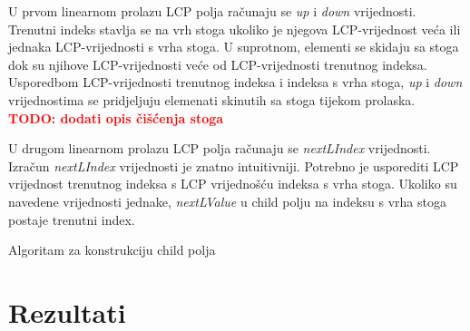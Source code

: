\documentclass[times, utf8, seminar, numeric]{fer}
\newcommand\todo[1]{\textbf{\textcolor{red}{TODO: #1}}}
\begin{document}
U prvom linearnom prolazu LCP polja računaju se \textit{up} i \textit{down} vrijednosti. Trenutni indeks stavlja se na vrh stoga ukoliko je njegova LCP-vrijednost veća ili jednaka LCP-vrijednosti s vrha stoga. U suprotnom, elementi se skidaju sa stoga dok su njihove LCP-vrijednosti veće od LCP-vrijednosti trenutnog indeksa. Usporedbom LCP-vrijednosti trenutnog indeksa i indeksa s vrha stoga, \textit{up} i \textit{down} vrijednostima se pridjeljuju elemenati skinutih sa stoga tijekom prolaska. \todo{dodati opis čišćenja stoga}

U drugom linearnom prolazu LCP polja računaju se \textit{nextLIndex} vrijednosti. Izračun \textit{nextLIndex} vrijednosti je znatno intuitivniji. Potrebno je usporediti LCP vrijednost trenutnog indeksa s LCP vrijednošću indeksa s vrha stoga. Ukoliko su navedene vrijednosti jednake, \textit{nextLValue} u child polju na indeksu s vrha stoga  postaje trenutni index.

\begin{algorithm}[h]
	\caption{Algoritam za konstrukciju child polja}
	\label{alg:child-array}

	
\end{algorithm}

\chapter{Rezultati}
\end{document}
